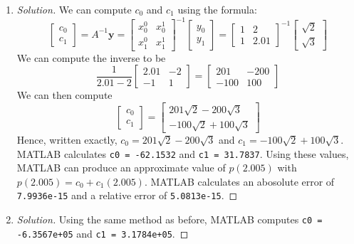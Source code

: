 \documentclass{article}
\begin{document}
\begin{enumerate}
	\item \begin{proof}[Solution]\let\qed\relax
		We can compute $c_0$ and $c_1$ using the formula:
		\[
			\begin{bmatrix} c_0 \\ c_1 \end{bmatrix}
			= A^{-1}\mathbf{y} =
			\begin{bmatrix} x_0^0 & x_0^1\\ x_1^0 & x_1^1 \end{bmatrix}^{-1}
			\begin{bmatrix} y_0 \\ y_1 \end{bmatrix}
			= \begin{bmatrix} 1 & 2 \\ 1 & 2.01 \end{bmatrix}^{-1}
			\begin{bmatrix} \sqrt{2} \\ \sqrt{3} \end{bmatrix}
		\]
		We can compute the inverse to be
		\[
			\frac{1}{2.01-2}\begin{bmatrix} 2.01 & -2 \\ -1 & 1 \end{bmatrix}
			= \begin{bmatrix} 201 & -200 \\ -100 & 100 \end{bmatrix}
		\]
		We can then compute
		\[
			\begin{bmatrix} c_0 \\ c_1 \end{bmatrix}
			= \begin{bmatrix} 201\sqrt{2} - 200\sqrt{3} \\ -100\sqrt{2} + 100\sqrt{3} \end{bmatrix}
		\]
		Hence, written exactly, $c_0 = 201\sqrt{2} - 200\sqrt{3}$
		and $c_1 = -100\sqrt{2} + 100\sqrt{3}$.
		MATLAB calculates \verb|c0 = -62.1532| and \verb|c1 = 31.7837|.
		Using these values, MATLAB can produce an approximate value
		of $p(2.005)$ with $p(2.005) = c_0 + c_1(2.005)$.
		MATLAB calculates an abosolute error of \verb|7.9936e-15|
		and a relative error of \verb|5.0813e-15|.
	\end{proof}
	\item \begin{proof}[Solution]\let\qed\relax
		Using the same method as before, MATLAB computes
		\verb|c0 = -6.3567e+05| and \verb|c1 = 3.1784e+05|.

\end{proof}
\end{enumerate}
\end{document}
